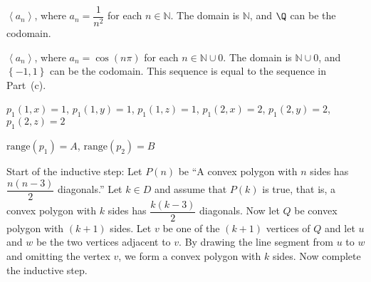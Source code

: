 \begin{list}{\bf{\ref{exer:sec62-3}.}} 
\item \begin{list}{\bf{(a)}}
\item $\left\langle {a_n } \right\rangle $,  where  $a_n  = \dfrac{1}{{n^2 }}$  for each  
$n \in \mathbb{N}$.  The domain is  $\mathbb{N}$, and $\Q$ can be the codomain.
\end{list}
\end{list}
%
\begin{list}{}
\item \begin{list}{\bf{(d)}}
\item $\left\langle {a_n } \right\rangle $,  where  $a_n  = \cos ( {n\pi } )$  for each  $n \in \mathbb{N} \cup {0}$.  The domain is  $\mathbb{N} \cup {0}$, and $\left\{ -1, 1 \right\}$ can be the codomain.  This sequence is equal to the sequence in Part~(c).
\end{list}
\end{list}


\begin{list}{\bf{\ref{sym:projfunc}.}}
\item \begin{list}{\bf{(a)}}
\item $p_1(1, x) = 1$, $p_1(1, y) = 1$, $p_1(1, z) = 1$, $p_1(2, x) = 2$, $p_1(2, y) = 2$, 
$p_1(2, z) = 2$
\end{list}
\end{list}

\begin{list}{}
\item \begin{list}{\bf{(c)}}
\item $\text{range}( p_1 ) = A$, $\text{range}( p_2 ) = B$
\end{list}
\end{list}




\begin{list}{\bf{\ref{exer:sec62-6}.}}
\item Start of the inductive step:  Let $P ( n )$ be ``A convex polygon with $n$ sides has $\dfrac{n ( n-3 )}{2}$ diagonals.''  
Let  $k \in D$  and assume that $P ( k )$ is true, that is, a convex polygon with  $k$  sides has  $\dfrac{{k( {k - 3} )}}{2}$  diagonals.   Now let  $Q$  be convex polygon with  $( {k + 1} )$ sides.  Let  $v$  be one of the $( {k + 1} )$ vertices of $Q$  and let  $u$  and  $w$  be the two vertices adjacent to  $v$.  By drawing the line segment from  $u$  to  $w$ and omitting the vertex  $v$, we form a convex polygon with  $k$  sides.  Now complete the inductive step.   
\end{list}


